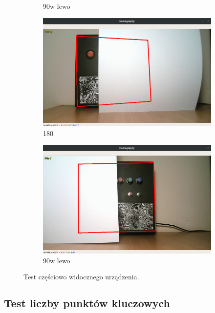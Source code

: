 \documentclass[12pt,twoside,polish]{article}
\begin{document}
\begin{figure}[htb!]
\begin{subfigure}[b]{0.5\textwidth}
		\caption{90\degree w lewo}
		\label{test_cover3}
	\end{subfigure}
	\begin{subfigure}[b]{0.5\textwidth}
		\includegraphics[width=\textwidth]{test_cover4}
		\caption{180\degree}
		\label{test_cover4}
	\end{subfigure}
	\begin{subfigure}[b]{0.5\textwidth}
		\includegraphics[width=\textwidth]{test_cover5}
		\caption{90\degree w lewo}
		\label{test_cover5}
	\end{subfigure}
	\caption{Test częściowo widocznego urządzenia.}
\end{figure}
\FloatBarrier

\subsection{Test liczby punktów kluczowych}
\label{section:test_kp}
\end{document}
